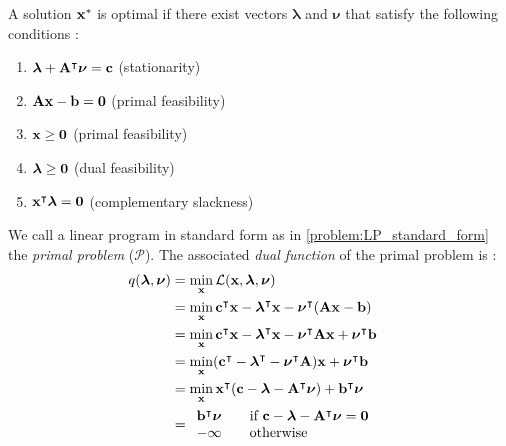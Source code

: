 \begin{theorem} \label{theorem:lp_duality}
    A solution $\bold x^*$ is optimal if there exist vectors $\boldsymbol \lambda$ and $\boldsymbol \nu$ that satisfy the following conditions \cite{noauthor_numerical_2006}:
    \begin{enumerate}
        \item $\boldsymbol \lambda + \bold A^\intercal \boldsymbol \nu = \bold c $ \hfill (stationarity)
        \item $ \bold A \bold x - \bold b = \bold 0$ \hfill (primal feasibility)
        \item $\bold x \geq \bold 0$ \hfill (primal feasibility)
        \item $\boldsymbol \lambda \geq \bold 0$ \hfill (dual feasibility)
        \item $\bold x^\intercal \boldsymbol \lambda = \bold 0$ \hfill (complementary slackness)
    \end{enumerate}
\end{theorem} 
We call a linear program in standard form as in \cref{problem:LP_standard_form} the \textit{primal problem} ($\mathcal{P}$).
The associated \textit{dual function} of the primal problem is \cite{aps_mosek_nodate}:
\begin{align*}
    q(\boldsymbol \lambda, \boldsymbol \nu)
    & = \min_{\bold x} \mathcal{L} (\bold x, \boldsymbol \lambda, \boldsymbol \nu) \\
    & = \min_{\bold x} \bold c^\intercal \bold x - \boldsymbol \lambda^\intercal \bold x - \boldsymbol \nu^\intercal (\bold A \bold x - \bold b) & \\
    & = \min_{\bold x} \bold c^\intercal \bold x - \boldsymbol \lambda^\intercal \bold x - \boldsymbol \nu^\intercal \bold A \bold x + \boldsymbol \nu^\intercal \bold b  &\\
    & = \min_{\bold x} (\bold c^\intercal - \boldsymbol \lambda^\intercal - \boldsymbol \nu^\intercal \bold A) \bold x + \boldsymbol \nu^\intercal \bold b  &\\
    & = \min_{\bold x} \bold x^\intercal (\bold c - \boldsymbol \lambda - \bold A^\intercal \boldsymbol \nu) + \bold b^\intercal \boldsymbol \nu &\\
    & = %
    \begin{array}{lr}
        \bold b^\intercal \boldsymbol \nu \quad \quad \text{if} \, \, \bold c - \boldsymbol \lambda - \bold A^\intercal \boldsymbol \nu = \bold 0\\
        - \infty \quad \quad \text{otherwise}
    \end{array}
\end{align*}
